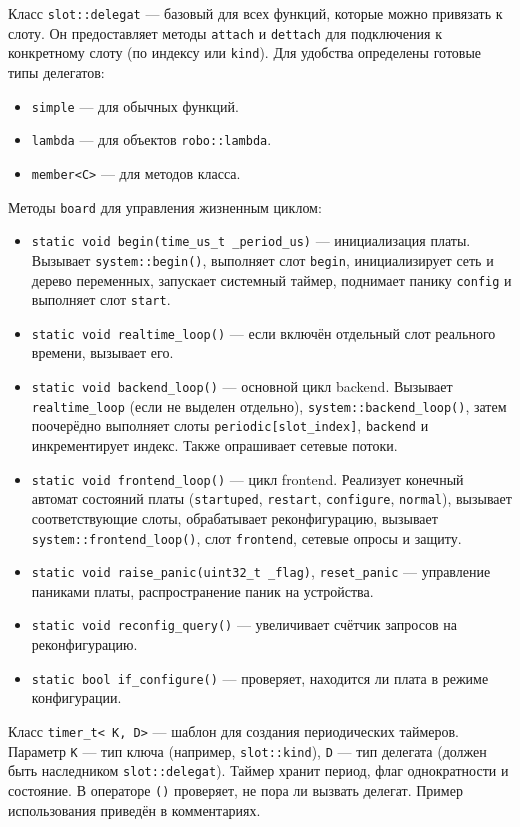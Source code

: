 \documentclass[a4paper,12pt]{article}
\begin{document}
Класс \texttt{slot::delegat} — базовый для всех функций, которые можно привязать к слоту. Он предоставляет методы \texttt{attach} и \texttt{dettach} для подключения к конкретному слоту (по индексу или \texttt{kind}). Для удобства определены готовые типы делегатов:
\begin{itemize}
    \item \texttt{simple} — для обычных функций.
    \item \texttt{lambda} — для объектов \texttt{robo::lambda}.
    \item \texttt{member<C>} — для методов класса.
\end{itemize}

Методы \texttt{board} для управления жизненным циклом:
\begin{itemize}
    \item \texttt{static void begin(time\_us\_t \_period\_us)} — инициализация платы. Вызывает \texttt{system::begin()}, выполняет слот \texttt{begin}, инициализирует сеть и дерево переменных, запускает системный таймер, поднимает панику \texttt{config} и выполняет слот \texttt{start}.
    \item \texttt{static void realtime\_loop()} — если включён отдельный слот реального времени, вызывает его.
    \item \texttt{static void backend\_loop()} — основной цикл backend. Вызывает \texttt{realtime\_loop} (если не выделен отдельно), \texttt{system::backend\_loop()}, затем поочерёдно выполняет слоты \texttt{periodic[slot\_index]}, \texttt{backend} и инкрементирует индекс. Также опрашивает сетевые потоки.
    \item \texttt{static void frontend\_loop()} — цикл frontend. Реализует конечный автомат состояний платы (\texttt{startuped}, \texttt{restart}, \texttt{configure}, \texttt{normal}), вызывает соответствующие слоты, обрабатывает реконфигурацию, вызывает \texttt{system::frontend\_loop()}, слот \texttt{frontend}, сетевые опросы и защиту.
    \item \texttt{static void raise\_panic(uint32\_t \_flag)}, \texttt{reset\_panic} — управление паниками платы, распространение паник на устройства.
    \item \texttt{static void reconfig\_query()} — увеличивает счётчик запросов на реконфигурацию.
    \item \texttt{static bool if\_configure()} — проверяет, находится ли плата в режиме конфигурации.
\end{itemize}

Класс \texttt{timer\_t< K, D>} — шаблон для создания периодических таймеров. Параметр \texttt{K} — тип ключа (например, \texttt{slot::kind}), \texttt{D} — тип делегата (должен быть наследником \texttt{slot::delegat}). Таймер хранит период, флаг однократности и состояние. В операторе \texttt{()} проверяет, не пора ли вызвать делегат. Пример использования приведён в комментариях.
\end{document}
